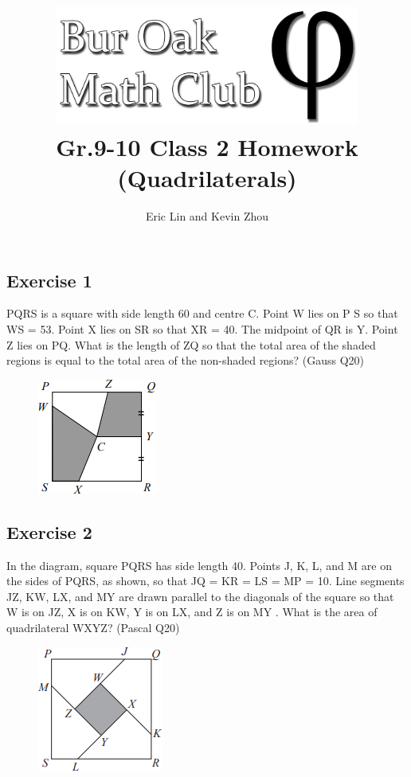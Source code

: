 \documentclass[12pt]{article}
\author{Eric Lin and Kevin Zhou}
\title{\includegraphics[width=10cm]{Bur Oak Math Club Banner Bold.png}\\\vspace{0.25in} Gr.9-10 Class 2 Homework (Quadrilaterals)}
\begin{document}
\maketitle

\subsection*{Exercise 1}
PQRS is a square with side length 60 and centre C. Point W lies on P S so that WS = 53. Point X lies on SR so that XR = 40. The midpoint of QR is Y. Point Z lies on PQ. What is the length of ZQ so that the total area of the shaded regions is equal to the total area of the non-shaded regions? (Gauss Q20)
\vspace*{0in}
\begin{figure}[h]
    \includegraphics{image1.png}
\end{figure}

\vspace{4in}

\subsection*{Exercise 2}
In the diagram, square PQRS has side length 40. Points J, K, L, and M are on the sides of PQRS, as shown, so that JQ = KR = LS = MP = 10. Line segments JZ, KW, LX, and MY are drawn parallel to the diagonals of the square so that W is on JZ, X is on KW, Y is on LX, and Z is on MY . What is the area of quadrilateral WXYZ? (Pascal Q20)
\vspace*{-0.1in}
\begin{figure}[h]
    \includegraphics[scale=0.80]{image2.png}
\end{figure}
\end{document}
